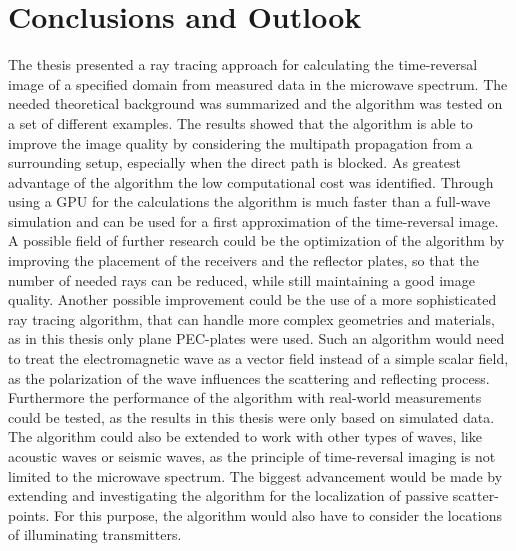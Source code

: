 
\chapter{Conclusions and Outlook}\label{chapter:conclusions}
The thesis presented a ray tracing approach for calculating the time-reversal image of a specified domain from measured data in the microwave spectrum.
The needed theoretical background was summarized and the algorithm was tested on a set of different examples.
The results showed that the algorithm is able to improve the image quality by considering the multipath propagation from a surrounding setup, especially when the direct path is blocked.
As greatest advantage of the algorithm the low computational cost was identified.
Through using a GPU for the calculations the algorithm is much faster than a full-wave simulation and can be used for a first approximation of the time-reversal image.
A possible field of further research could be the optimization of the algorithm by improving the placement of the receivers and the reflector plates, so that the number of needed rays can be reduced, while still maintaining a good image quality.
Another possible improvement could be the use of a more sophisticated ray tracing algorithm, that can handle more complex geometries and materials, as in this thesis only plane PEC-plates were used.
Such an algorithm would need to treat the electromagnetic wave as a vector field instead of a simple scalar field, as the polarization of the wave influences the scattering and reflecting process.
Furthermore the performance of the algorithm with real-world measurements could be tested, as the results in this thesis were only based on simulated data.
The algorithm could also be extended to work with other types of waves, like acoustic waves or seismic waves, as the principle of time-reversal imaging is not limited to the microwave spectrum.
The biggest advancement would be made by extending and investigating the algorithm for the localization of passive scatter-points.
For this purpose, the algorithm would also have to consider the locations of illuminating transmitters.



